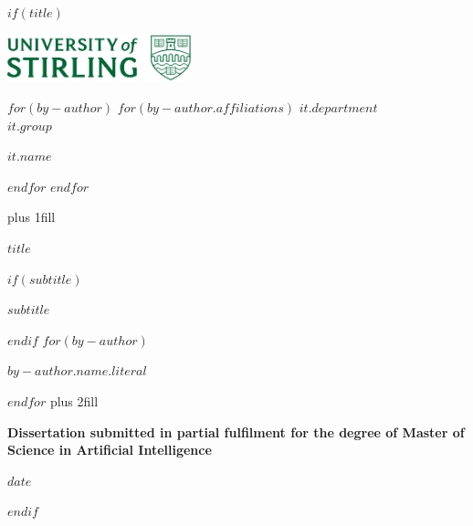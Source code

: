 
$if(title)$

\cleardoublepage
\thispagestyle{empty}

\begin{flushright}
\includegraphics[width=0.4\textwidth]{uos_logo.png} 
\end{flushright}

\begin{center}

$for(by-author)$
$for(by-author.affiliations)$
{\large \textit{$it.department$} \\}
{\large \textit{$it.group$} \\}
{\large \textit{$it.name$} \par}
$endfor$
$endfor$

\hbox{}\vskip 0cm plus 1fill
{\Huge\bfseries $title$ \par}
$if(subtitle)$
{\Large\bfseries $subtitle$ \par}
$endif$
\vspace{5ex}
$for(by-author)$
{\Large\bfseries $by-author.name.literal$ \par}
$endfor$
\vskip 1cm plus 2fill

{\bfseries\small Dissertation submitted in partial fulfilment for the degree of
Master of Science in Artificial Intelligence \par}
\vspace{2ex}
{\bfseries\small $date$ \par}

\end{center}
$endif$

\clearpage
{}
\setcounter{page}{1}
